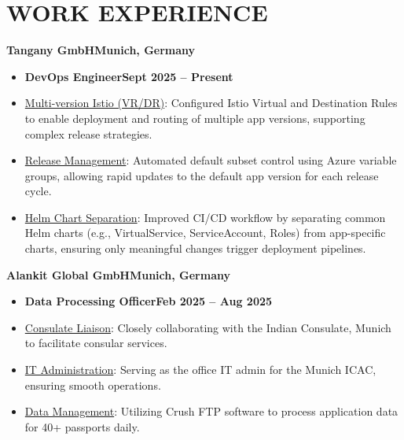 \documentclass[11pt,a4paper]{article}
\newenvironment{dashlist}{
  \begin{itemize}[label={--}]
}{
  \end{itemize}
}
\begin{document}
\section*{WORK EXPERIENCE}

\noindent\textbf{Tangany GmbH\hfill Munich, Germany}
\begin{itemize}
    \item \textbf{DevOps Engineer\hfill Sept 2025 -- Present}
\end{itemize}
\begin{dashlist}
    \item \uline{Multi-version Istio (VR/DR)}: Configured Istio Virtual and Destination Rules to enable deployment and routing of multiple app versions, supporting complex release strategies.
    \item \uline{Release Management}: Automated default subset control using Azure variable groups, allowing rapid updates to the default app version for each release cycle.
    \item \uline{Helm Chart Separation}: Improved CI/CD workflow by separating common Helm charts (e.g., VirtualService, ServiceAccount, Roles) from app-specific charts, ensuring only meaningful changes trigger deployment pipelines.
\end{dashlist}
\medskip

\noindent\textbf{Alankit Global GmbH\hfill Munich, Germany}
\begin{itemize}
\item \textbf{Data Processing Officer\hfill Feb 2025 – Aug 2025}
\end{itemize}
\begin{dashlist}
  \item \uline {Consulate Liaison}: Closely collaborating with the Indian Consulate, Munich to facilitate consular services.
  \item \uline {IT Administration}: Serving as the office IT admin for the Munich ICAC, ensuring smooth operations.
  \item \uline {Data Management}: Utilizing Crush FTP software to process application data for 40+ passports daily.

\end{dashlist}
\end{document}
